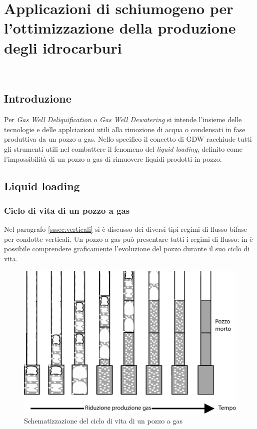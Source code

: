 \clearpage{\pagestyle{empty}\cleardoublepage}
\chapter{Applicazioni di schiumogeno per l'ottimizzazione della produzione degli idrocarburi}
\
\section{Introduzione}
Per \textit{Gas Well Deliquification} o \textit{Gas Well Dewatering} si intende l'insieme delle tecnologie e delle applciazioni utili alla rimozione di acqua o condensati in fase produttiva da un pozzo a gas. Nello specifico il concetto di GDW racchiude tutti gli strumenti utili nel combattere il fenomeno del \textit{liquid loading}, definito come l'impossibilità di un pozzo a gas di rimuovere liquidi prodotti in pozzo. 

\section{Liquid loading}
\subsection{Ciclo di vita di un pozzo a gas}
Nel paragrafo \ref{sssec:verticali} si è discusso dei diversi tipi regimi di flusso bifase per condotte verticali. Un pozzo a gas può presentare tutti i regimi di flusso: in  è possibile comprendere graficamente l'evoluzione del pozzo durante il suo ciclo di vita.

\begin{figure}[htbp]
    \centering
    \includegraphics[width=.8\textwidth]{fig/foamer/wellhistory.eps}
    \caption{Schematizzazione del ciclo di vita di un pozzo a gas}
    \label{fig:wellhistory}
\end{figure}

